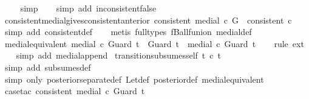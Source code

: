 \begin{isabellebody}
\ \ \ \isamarkupfalse%
\ simp\isanewline
\ \ \isamarkupfalse%
\ {\isacharparenleft}simp\ add{\isacharcolon}\ inconsistent{\isacharunderscore}false{\isacharparenright}%
\endisatagproof
{\isafoldproof}%
%
\isadelimproof
\isanewline
%
\endisadelimproof
\isanewline
{}\isamarkupfalse%
\ consistent{\isacharunderscore}medial{\isacharunderscore}gives{\isacharunderscore}consistent{\isacharunderscore}anterior{\isacharcolon}\ {\isachardoublequoteopen}consistent\ {\isacharparenleft}medial\ c\ G{\isacharparenright}\ {\isasymLongrightarrow}\ consistent\ c{\isachardoublequoteclose}\isanewline
%
\isadelimproof
\ \ %
\endisadelimproof
%
\isatagproof
{}\isamarkupfalse%
\ {\isacharparenleft}simp\ add{\isacharcolon}\ consistent{\isacharunderscore}def{\isacharparenright}\isanewline
\ \ \isamarkupfalse%
\ {\isacharparenleft}metis\ {\isacharparenleft}full{\isacharunderscore}types{\isacharparenright}\ fBall{\isacharunderscore}funion\ medial{\isacharunderscore}def{\isacharparenright}%
\endisatagproof
{\isafoldproof}%
%
\isadelimproof
\isanewline
%
\endisadelimproof
\isanewline
{}\isamarkupfalse%
\ medial{\isacharunderscore}equivalent{\isacharcolon}\ {\isachardoublequoteopen}medial\ c\ {\isacharparenleft}Guard\ t\ {\isacharat}\ Guard\ t{\isacharparenright}\ {\isacharequal}\ medial\ c\ {\isacharparenleft}Guard\ t{\isacharparenright}{\isachardoublequoteclose}\isanewline
%
\isadelimproof
\ \ %
\endisadelimproof
%
\isatagproof
{}\isamarkupfalse%
\ {\isacharparenleft}rule\ ext{\isacharparenright}\isanewline
\ \ \isamarkupfalse%
\ {\isacharparenleft}simp\ add{\isacharcolon}\ medial{\isacharunderscore}append{\isacharparenright}%
\endisatagproof
{\isafoldproof}%
%
\isadelimproof
\isanewline
%
\endisadelimproof
\isanewline
{}\isamarkupfalse%
\ transition{\isacharunderscore}subsumes{\isacharunderscore}self{\isacharcolon}\ {\isachardoublequoteopen}t\ \isactrlsub c{\isasymsqsupseteq}\ t{\isachardoublequoteclose}\isanewline
%
\isadelimproof
\ \ %
\endisadelimproof
%
\isatagproof
{}\isamarkupfalse%
\ {\isacharparenleft}simp\ add{\isacharcolon}\ subsumes{\isacharunderscore}def{\isacharparenright}\isanewline
\ \ \isamarkupfalse%
\ {\isacharparenleft}simp\ only{\isacharcolon}\ posterior{\isacharunderscore}separate{\isacharunderscore}def\ Let{\isacharunderscore}def\ posterior{\isacharunderscore}def\ medial{\isacharunderscore}equivalent{\isacharparenright}\isanewline
\ \ \isamarkupfalse%
\ {\isacharparenleft}case{\isacharunderscore}tac\ {\isachardoublequoteopen}consistent\ {\isacharparenleft}medial\ c\ {\isacharparenleft}Guard\ t{\isacharparenright}{\isacharparenright}{\isachardoublequoteclose}{\isacharparenright}\isanewline

\end{isabellebody}
